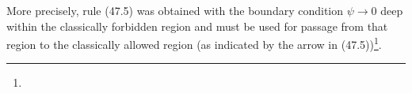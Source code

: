 More precisely, rule (47.5) was obtained with the boundary condition $\psi\to0$ deep within the classically forbidden region and must be used for passage from that region to the classically allowed region (as indicated by the arrow in (47.5))\footnote{}.
